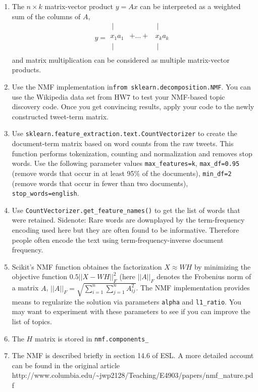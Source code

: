 \documentclass[11pt]{article}
\begin{document}
\begin{enumerate}
\def\labelenumi{\arabic{enumi})}
\item
  The \(n \times k\) matrix-vector product \(y=Ax\) can be interpreted
  as a weighted sum of the columns of \(A\), \[
  y=
  \begin{array}{ccc}
  ~\mid &  & ~\mid \\
  x_1 a_1 & + \ldots + & x_k a_k \\
  ~\mid & & ~\mid \\
  \end{array}
  \] and matrix multiplication can be considered as multiple
  matrix-vector products.
\item
  Use the NMF implementation in\texttt{from\ sklearn.decomposition.NMF}.
  You can use the Wikipedia data set from HW7 to test your NMF-based
  topic discovery code. Once you get convincing results, apply your code
  to the newly constructed tweet-term matrix.
\item
  Use \texttt{sklearn.feature\_extraction.text.CountVectorizer} to
  create the document-term matrix based on word counts from the raw
  tweets. This function performs tokenization, counting and
  normalization and removes stop words. Use the following parameter
  values \texttt{max\_features=k}, \texttt{max\_df=0.95} (remove words
  that occur in at least 95\% of the documents), \texttt{min\_df=2}
  (remove words that occur in fewer than two documents),
  \texttt{stop\_words=\textquotesingle{}english\textquotesingle{}}.
\item
  Use \texttt{CountVectorizer.get\_feature\_names()} to get the list of
  words that were retained. Sidenote: Rare words are downplayed by the
  term-frequency encoding used here but they are often found to be
  informative. Therefore people often encode the text using
  term-frequency-inverse document frequency.
\item
  Scikit's NMF function obtaines the factorization \(X \approx WH\) by
  minimizing the objective function \(0.5||X - WH||_F^2\) (here
  \(||A||_F\) denotes the Frobenius norm of a matrix \(A\),
  \(||A||_F = \sqrt{\sum_{i=1}^n \sum_{j=1}^n A_{ij}^2}\). The NMF
  implementation provides means to regularize the solution via
  parameters \texttt{alpha} and \texttt{l1\_ratio}. You may want to
  experiment with these parameters to see if you can improve the list of
  topics.
\item
  The \(H\) matrix is stored in \texttt{nmf.components\_}
\item
  The NMF is described briefly in section 14.6 of ESL. A more detailed
  account can be found in the original article
  http://www.columbia.edu/\textasciitilde{}jwp2128/Teaching/E4903/papers/nmf\_nature.pdf
\end{enumerate}
\end{document}
